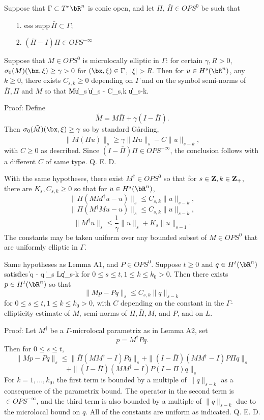  Suppose that $\Gamma \subset T^*\bR^n$ is conic open, and let $\Pi$, $\bar{\Pi} \in OPS^0$ be such that 
\begin{itemize}
\item[1. ]$\mbox{ess supp} \,\bar{\Pi} \subset \Gamma$;
\item[2. ]$(\bar{\Pi}-I)\Pi \in OPS^{-\infty}$
\end{itemize}
Suppose that $M \in OPS^0$ is microlocally elliptic in $\Gamma$: for certain $\gamma, R>0$,  $\sigma_0(M)(\bx,\xi)  \ge \gamma > 0$ for $(\bx,\xi) \in \Gamma$, $|\xi|>R$.   Then for $u \in H^s(\bR^n)$, any $k \ge 0$, there exists $C_{s,k} \ge 0$ depending on $\Gamma$ and on the symbol semi-norms of  $\bar{\Pi}, \Pi$ and $M$ so that
\be
\label{garding}
\|M\Pi u\|_s \ge \gamma \|\Pi u\|_s - C_{s,k} \|u\|_{s-k}.
\ee

\noindent Proof: Define
\[
\tilde{M} = M \bar{\Pi} + \gamma (I-\bar{\Pi}).
\]
Then $\sigma_0(\tilde{M})(\bx,\xi) \ge \gamma$ so by standard G\aa rding, 
\[
\|\tilde{M}(\Pi u)\|_s \ge \gamma \|\Pi u\|_s - C \|u\|_{s-k},
\]
with $C \ge 0$ as described. Since $(I-\bar{\Pi})\Pi \in OPS^{-\infty}$, the conclusion follows with a different $C$ of same type. Q. E. D.

 With the same hypotheses, there exist $M^{\dagger} \in OPS^0$ so that for $s \in {\bf Z}, k \in {\bf Z}_+$, there are $K_s, C_{s,k} \ge 0$ so that for $u \in H^s(\bR^n)$,
\[
\|\Pi (MM^{\dagger}u - u)\|_s \le C_{s,k} \|u\|_{s-k},
\]
\[
\|\Pi (M^{\dagger}Mu - u)\|_s \le C_{s,k} \|u\|_{s-k},
\]
\[
\|M^{\dagger}u\|_s \le \frac{1}{\gamma}\|u\|_s + K_s \|u\|_{s-1}.
\]
The constants may be taken uniform over any bounded subset of $M \in OPS^0$ that are uniformly elliptic in $\Gamma$.

 Same hypotheses as Lemma A1, and $P \in OPS^0$. Suppose $t \ge 0$ and $q \in H^t(\bR^n)$ satisfies
\be
\label{microlocal}
\|\Pi q - q \|_s \le L\|q\|_{s-k}
\ee
for $0 \le s \le t, 1 \le k \le k_0 > 0$. Then there exists $p\in H^t(\bR^n)$ so that
\[
\|Mp - Pq\|_s \le C_{s,k}\|q\|_{s-k} 
\]
for $0 \le s \le t, 1 \le k \le k_0 > 0$, with $C$ depending on the constant in the $\Gamma$-ellipticity estimate of $M$,  semi-norms of $\Pi, \bar{\Pi}, M$, and $P$, and on $L$.

\noindent Proof: Let $M^{\dagger}$ be a $\Gamma$-microlocal parametrix as in Lemma A2, set
\[
p = M^{\dagger}Pq.
\]
Then for $0 \le s \le t$, 
\[
\|Mp-Pq\|_s \le \|\bar{\Pi}(MM^{\dagger}-I)Pq\|_s + \|(I-\bar{\Pi})(MM^{\dagger}-I)P\Pi q\|_s 
\]
\[
+ \|(I-\bar{\Pi})(MM^{\dagger}-I)P(I-\Pi) q\|_s
\]
For $k=1,...,k_0$, the first term is bounded by a multiple of $\|q\|_{s-k}$ as a consequence of the parametrix bound. The operator in the second term is $\in OPS^{-\infty}$, and the third term is also bounded by a multiple of $\|q\|_{s-k}$ due to the microlocal bound on $q$. All of the constants are uniform as indicated. Q. E. D.


